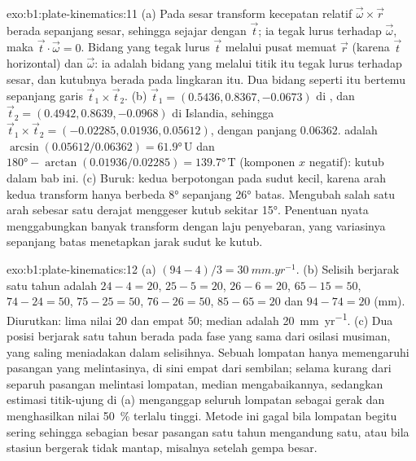 \begin{solution}{exo:b1:plate-kinematics:11}
(a) Pada sesar transform kecepatan relatif $\vec\omega\times\vec r$ berada sepanjang
sesar, sehingga sejajar dengan $\vec t$; ia tegak lurus terhadap $\vec\omega$, maka
$\vec t\cdot\vec\omega = 0$. Bidang yang tegak lurus $\vec t$ melalui pusat memuat $\vec r$ (karena $\vec t$ horizontal) dan $\vec\omega$: ia
adalah bidang  yang melalui titik itu tegak lurus terhadap sesar,
dan kutubnya berada pada lingkaran itu. Dua bidang seperti itu bertemu sepanjang garis
$\vec t_1\times\vec t_2$. (b) $\vec t_1 = (0.5436, 0.8367, -0.0673)$ di , dan
$\vec t_2 = (0.4942, 0.8639, -0.0968)$ di Islandia, sehingga
$\vec t_1\times\vec t_2 = (-0.02285, 0.01936, 0.05612)$, dengan panjang $0.06362$.
 adalah $\arcsin(0.05612/0.06362) = \ang{61.9}$\,U dan 
$\ang{180} - \arctan(0.01936/0.02285) = \ang{139.7}$\,T (komponen $x$ negatif):
kutub dalam bab ini. (c) Buruk: kedua  berpotongan pada sudut kecil, karena arah kedua transform hanya berbeda \ang{8} sepanjang \ang{26} batas.
Mengubah salah satu arah sebesar satu derajat menggeser kutub sekitar \ang{15}. Penentuan nyata menggabungkan banyak transform dengan laju penyebaran, yang variasinya sepanjang batas menetapkan jarak sudut ke kutub.
\end{solution}

\begin{solution}{exo:b1:plate-kinematics:12}
(a) $(94 - 4)/3 = \qty{30}{mm.yr^{-1}}$. (b) Selisih berjarak satu tahun adalah
$24 - 4 = 20$, $25 - 5 = 20$, $26 - 6 = 20$, $65 - 15 = 50$, $74 - 24 = 50$,
$75 - 25 = 50$, $76 - 26 = 50$, $85 - 65 = 20$ dan $94 - 74 = 20$ (mm). Diurutkan:
lima nilai 20 dan empat 50; median adalah \qty{20}{mm.yr^{-1}}. (c) Dua posisi
berjarak satu tahun berada pada fase yang sama dari osilasi musiman, yang saling meniadakan dalam selisihnya. Sebuah lompatan hanya memengaruhi pasangan yang melintasinya, di sini empat dari sembilan; selama kurang dari separuh pasangan melintasi lompatan, median mengabaikannya, sedangkan estimasi titik-ujung di (a) menganggap seluruh lompatan sebagai gerak dan menghasilkan nilai \qty{50}{\percent} terlalu tinggi. Metode ini gagal bila lompatan begitu sering sehingga sebagian besar pasangan satu tahun mengandung satu, atau bila stasiun bergerak tidak mantap, misalnya setelah gempa besar.
\end{solution}

